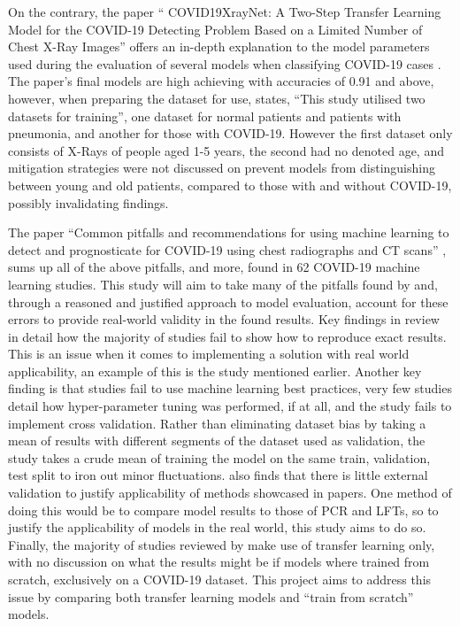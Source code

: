 On the contrary, the paper “ COVID19XrayNet: A Two-Step Transfer Learning Model for the COVID-19 Detecting Problem Based on a Limited Number of Chest X-Ray Images” offers an in-depth explanation to the model parameters used during the evaluation of several models when classifying COVID-19 cases \citep{zhang2020covid19xraynet}. The paper’s final models are high achieving with accuracies of 0.91 and above, however, when preparing the dataset for use, \cite{zhang2020covid19xraynet} states, “This study utilised two datasets for training”, one dataset for normal patients and patients with pneumonia, and another for those with COVID-19. However the first dataset only consists of X-Rays of people aged 1-5 years, the second had no denoted age, and mitigation strategies were not discussed on prevent models from distinguishing between young and old patients, compared to those with and without COVID-19, possibly invalidating findings.

The paper “Common pitfalls and recommendations for using machine learning to detect and prognosticate for COVID-19 using chest radiographs and CT scans” \citep{roberts2021common}, sums up all of the above pitfalls, and more, found in 62 COVID-19 machine learning studies. This study will aim to take many of the pitfalls found by \cite{roberts2021common} and, through a reasoned and justified approach to model evaluation, account for these errors to provide real-world validity in the found results. Key findings in \cite{roberts2021common} review in detail how the majority of studies fail to show how to reproduce exact results. This is an issue when it comes to implementing a solution with real world applicability, an example of this is the \cite{bressem2020comparing} study mentioned earlier. Another key finding is that studies fail to use machine learning best practices, very few studies detail how hyper-parameter tuning was performed, if at all, and the \cite{bressem2020comparing} study fails to implement cross validation. Rather than eliminating dataset bias by taking a mean of results with different segments of the dataset used as validation, the study takes a crude mean of training the model on the same train, validation, test split to iron out minor fluctuations. \cite{roberts2021common} also finds that there is little external validation to justify applicability of methods showcased in papers. One method of doing this would be to compare model results to those of PCR and LFTs, so to justify the applicability of models in the real world, this study aims to do so. Finally, the majority of studies reviewed by \cite{roberts2021common} make use of transfer learning only, with no discussion on what the results might be if models where trained from scratch, exclusively on a COVID-19 dataset. This project aims to address this issue by comparing both transfer learning models and “train from scratch” models.

